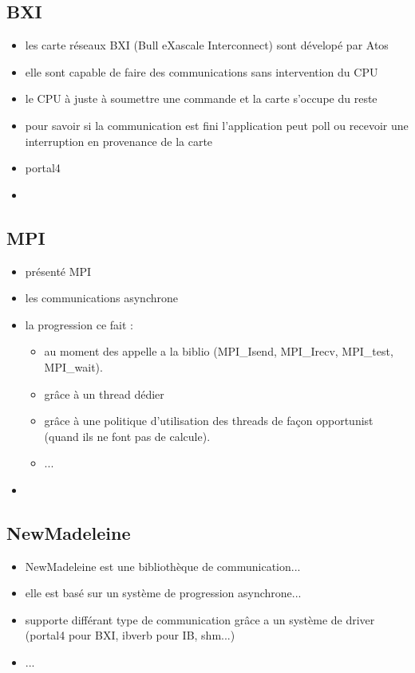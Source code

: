 \subsection{BXI}

\begin{itemize}
  \item les carte réseaux BXI (Bull eXascale Interconnect) sont dévelopé par Atos
  \item elle sont capable de faire des communications sans intervention du CPU %
  \item le CPU à juste à soumettre une commande et la carte s'occupe du reste
  \item pour savoir si la communication est fini l'application peut poll ou recevoir une interruption en provenance de la carte
  \item portal4
  \item 
\end{itemize}

\subsection{MPI}

\begin{itemize}
  \item présenté MPI
  \item les communications asynchrone
  \item la progression ce fait :
  \begin{itemize}
    \item au moment des appelle a la biblio (MPI_Isend, MPI_Irecv, MPI_test, MPI_wait).
    \item grâce à un thread dédier
    \item grâce à une politique d'utilisation des threads de façon opportunist (quand ils ne font pas de calcule).
    \item ...
  \end{itemize}
  \item 
\end{itemize}

\subsection{NewMadeleine}

\begin{itemize}
  \item NewMadeleine est une bibliothèque de communication...
  \item elle est basé sur un système de progression asynchrone...
  \item supporte différant type de communication grâce a un système de driver (portal4 pour BXI, ibverb pour IB, shm...)
  \item ...
\end{itemize}

